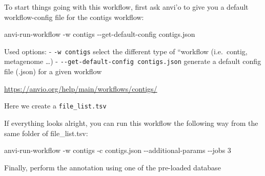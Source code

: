 \documentclass[
]{book}
\newenvironment{Shaded}{\begin{snugshade}}{\end{snugshade}}
\newcommand{\AttributeTok}[1]{\textcolor[rgb]{0.13,0.29,0.53}{#1}}
\newcommand{\BuiltInTok}[1]{#1}
\newcommand{\CommentTok}[1]{\textcolor[rgb]{0.56,0.35,0.01}{\textit{#1}}}
\newcommand{\ControlFlowTok}[1]{\textcolor[rgb]{0.13,0.29,0.53}{\textbf{#1}}}
\newcommand{\DataTypeTok}[1]{\textcolor[rgb]{0.13,0.29,0.53}{#1}}
\newcommand{\ExtensionTok}[1]{#1}
\newcommand{\FunctionTok}[1]{\textcolor[rgb]{0.13,0.29,0.53}{\textbf{#1}}}
\newcommand{\KeywordTok}[1]{\textcolor[rgb]{0.13,0.29,0.53}{\textbf{#1}}}
\newcommand{\NormalTok}[1]{#1}
\newcommand{\OperatorTok}[1]{\textcolor[rgb]{0.81,0.36,0.00}{\textbf{#1}}}
\newcommand{\PreprocessorTok}[1]{\textcolor[rgb]{0.56,0.35,0.01}{\textit{#1}}}
\newcommand{\StringTok}[1]{\textcolor[rgb]{0.31,0.60,0.02}{#1}}
\newcommand{\VariableTok}[1]{\textcolor[rgb]{0.00,0.00,0.00}{#1}}
\begin{document}
To start things going with this workflow, first ask anvi'o to give you a default workflow-config file for the contigs workflow:

\begin{Shaded}
\begin{Highlighting}[]
\ExtensionTok{anvi{-}run{-}workflow} \AttributeTok{{-}w}\NormalTok{ contigs }\AttributeTok{{-}{-}get{-}default{-}config}\NormalTok{ contigs.json}
\end{Highlighting}
\end{Shaded}

Used options:
- \texttt{-w\ contigs} select the different type of ``workflow (i.e.~contig, metagenome \ldots)
- \texttt{-\/-get-default-config\ contigs.json} generate a default config file (.json) for a given workflow

\url{https://anvio.org/help/main/workflows/contigs/}

Here we create a \texttt{file\_list.tsv}

\begin{Shaded}
\end{Shaded}

If everything looks alright, you can run this workflow the following way from the same folder of file\_list.tsv:

\begin{Shaded}
\begin{Highlighting}[]
\ExtensionTok{anvi{-}run{-}workflow} \AttributeTok{{-}w}\NormalTok{ contigs }\AttributeTok{{-}c}\NormalTok{ contigs.json }\AttributeTok{{-}{-}additional{-}params} \AttributeTok{{-}{-}jobs}\NormalTok{ 3}
\end{Highlighting}
\end{Shaded}

Finally, perform the annotation using one of the pre-loaded database

\begin{Shaded}
\end{Shaded}
\end{document}
